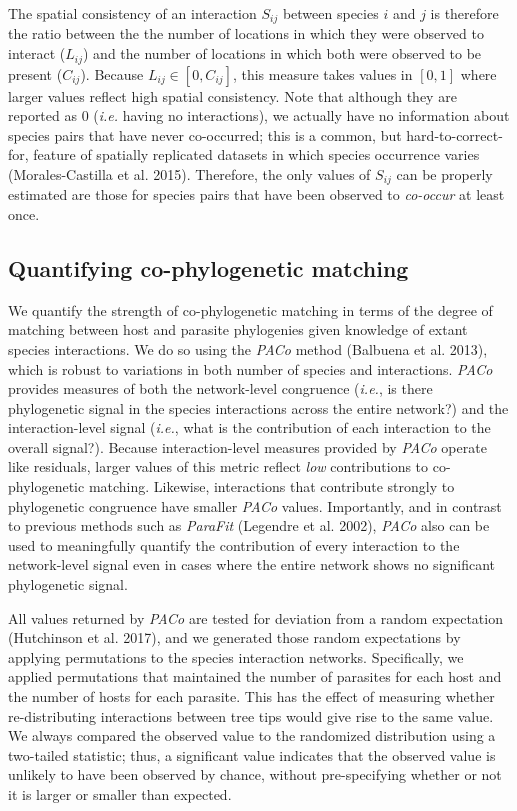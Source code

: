 \documentclass[11pt,serif]{article}
\begin{document}
The spatial consistency of an interaction \(S_{ij}\) between species
\(i\) and \(j\) is therefore the ratio between the the number of
locations in which they were observed to interact (\(L_{ij}\)) and the
number of locations in which both were observed to be present
(\(C_{ij}\)). Because \(L_{ij} \in [0,C_{ij}]\), this measure takes
values in \([0,1]\) where larger values reflect high spatial
consistency. Note that although they are reported as 0 (\emph{i.e.}
having no interactions), we actually have no information about species
pairs that have never co-occurred; this is a common, but
hard-to-correct-for, feature of spatially replicated datasets in which
species occurrence varies (Morales-Castilla et al. 2015). Therefore, the
only values of \(S_{ij}\) can be properly estimated are those for
species pairs that have been observed to \emph{co-occur} at least once.

\subsection{Quantifying co-phylogenetic
matching}\label{quantifying-co-phylogenetic-matching}

We quantify the strength of co-phylogenetic matching in terms of the
degree of matching between host and parasite phylogenies given knowledge
of extant species interactions. We do so using the \emph{PACo} method
(Balbuena et al. 2013), which is robust to variations in both number of
species and interactions. \emph{PACo} provides measures of both the
network-level congruence (\emph{i.e.}, is there phylogenetic signal in
the species interactions across the entire network?) and the
interaction-level signal (\emph{i.e.}, what is the contribution of each
interaction to the overall signal?). Because interaction-level measures
provided by \emph{PACo} operate like residuals, larger values of this
metric reflect \emph{low} contributions to co-phylogenetic matching.
Likewise, interactions that contribute strongly to phylogenetic
congruence have smaller \emph{PACo} values. Importantly, and in contrast
to previous methods such as \emph{ParaFit} (Legendre et al. 2002),
\emph{PACo} also can be used to meaningfully quantify the contribution
of every interaction to the network-level signal even in cases where the
entire network shows no significant phylogenetic signal.

All values returned by \emph{PACo} are tested for deviation from a
random expectation (Hutchinson et al. 2017), and we generated those
random expectations by applying permutations to the species interaction
networks. Specifically, we applied permutations that maintained the
number of parasites for each host and the number of hosts for each
parasite. This has the effect of measuring whether re-distributing
interactions between tree tips would give rise to the same value. We
always compared the observed value to the randomized distribution using
a two-tailed statistic; thus, a significant value indicates that the
observed value is unlikely to have been observed by chance, without
pre-specifying whether or not it is larger or smaller than expected.
\end{document}
